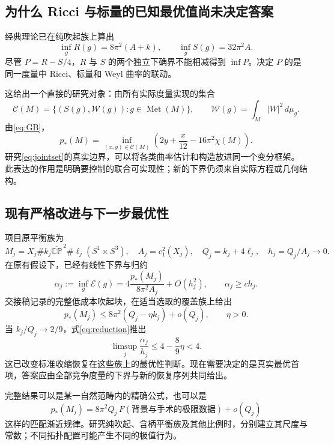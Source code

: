 \documentclass[11pt,a4paper]{article}
\newcommand{\Met}{\operatorname{Met}}
\newcommand{\CP}{\mathbb{CP}}
\newcommand{\dd}{\,d\mu_g}
\theoremstyle{definition}
\numberwithin{equation}{section}
\begin{document}
\subsection{为什么 Ricci 与标量的已知最优值尚未决定答案}
经典理论已在纯吹起族上算出\cite{LeBrun2001}
\[
\inf_gR(g)=8\pi^2(A+k),\qquad
\inf_gS(g)=32\pi^2A.
\]
尽管 $P=R-S/4$，$R$ 与 $S$ 的两个独立下确界不能相减得到 $\inf P$。决定 $P$ 的是同一度量中 Ricci、标量和 Weyl 曲率的联动。

这给出一个直接的研究对象：由所有实际度量实现的集合
\begin{equation}
\mathcal C(M)=\{(S(g),\mathcal W(g)):g\in\Met(M)\},
\qquad \mathcal W(g)=\int_M|W|^2\dd.\label{eq:jointset}
\end{equation}
由\eqref{eq:GB}，
\begin{equation}
p_*(M)=\inf_{(x,y)\in\mathcal C(M)}
\left(2y+\frac{x}{12}-16\pi^2\chi(M)\right).\label{eq:support}
\end{equation}
研究\eqref{eq:jointset}的真实边界，可以将各类曲率估计和构造放进同一个变分框架。此表达的作用是明确要控制的联合可实现性；新的下界仍须来自实际方程或几何结构。

\subsection{现有严格改进与下一步最优性}
项目原平衡族为
\[
M_j=X_j\#k_j\overline{\CP}^{\,2}\#\ell_j(S^1\times S^3),\quad
A_j=c_1^2(X_j),\quad Q_j=k_j+4\ell_j,\quad h_j=Q_j/A_j\to0.
\]
在原有假设下，已经有线性下界与归约
\begin{equation}
\alpha_j:=\inf_g\mathcal E(g)
=4\frac{p_*(M_j)}{8\pi^2A_j}+O(h_j^2),\qquad \alpha_j\ge c h_j.\label{eq:reduction}
\end{equation}
交接稿记录的完整低成本吹起块，在适当选取的覆盖族上给出
\begin{equation}
p_*(M_j)\le8\pi^2(Q_j-\eta k_j)+o(Q_j),\qquad\eta>0.\label{eq:substandard}
\end{equation}
当 $k_j/Q_j\to2/9$，式\eqref{eq:reduction}推出
\begin{equation}
\limsup_j\frac{\alpha_j}{h_j}\le4-\frac89\eta<4.\label{eq:subfour}
\end{equation}
这已改变标准收缩恢复在这些族上的最优性判断\cite{Project}。现在需要决定的是真实最优首项，答案应由全部竞争度量的下界与新的恢复序列共同给出。

完整结果可以是某一自然范畴内的精确公式，也可以是
\[
p_*(M_j)=8\pi^2Q_j\,F(\text{背景与手术的极限数据})+o(Q_j)
\]
这样的匹配渐近规律。研究纯吹起、含柄平衡族及其他比例时，分别建立其尺度与常数；不同拓扑配置可能产生不同的极值行为。
\end{document}
